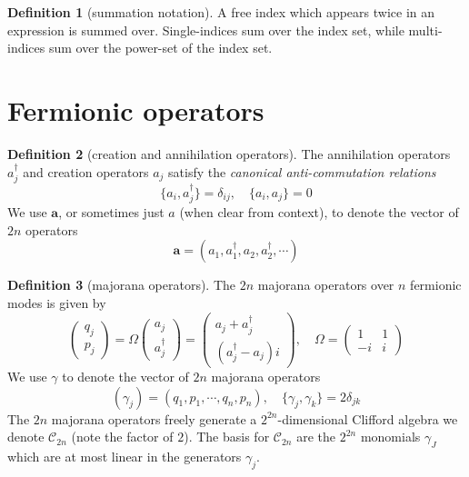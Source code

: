 \documentclass[
]{book}
\theoremstyle{definition}
\newtheorem{definition}{Definition}[chapter]
\theoremstyle{definition}
\theoremstyle{definition}
\theoremstyle{definition}
\theoremstyle{remark}
\begin{document}
\begin{definition}[summation notation]
\protect\hypertarget{def:implicitsum}{}\label{def:implicitsum}A free index which appears twice in an expression is summed over.
Single-indices sum over the index set, while multi-indices sum over the
power-set of the index set.
\end{definition}

\section{Fermionic operators}\label{fermionic-operators}

\begin{definition}[creation and annihilation operators]
\protect\hypertarget{def:car}{}\label{def:car}The annihilation operators \(a_j^\dagger\) and
creation operators \(a_j\) satisfy the \emph{canonical anti-commutation relations}
\[ 
    \{a_i, a_j^\dagger\} = \delta_{ij}, \quad \{a_i, a_j\} = 0
\]
We use \(\mathbf a\), or sometimes just \(a\) (when clear from context),
to denote the vector of \(2n\) operators
\[ 
    \mathbf a = (a_1, a_1^\dagger, a_2, a_2^\dagger, \cdots)
\]
\end{definition}

\begin{definition}[majorana operators]
\protect\hypertarget{def:maj}{}\label{def:maj}The \(2n\) majorana operators over \(n\) fermionic modes is given by
\[ 
\begin{pmatrix}
        q_j \\ p_j 
    \end{pmatrix} = \Omega \begin{pmatrix}
        a_j \\ a_j^\dagger
    \end{pmatrix} = \begin{pmatrix}
    a_j + a_j^\dagger\\ 
    (a_j^\dagger- a_j)i
    \end{pmatrix}, \quad 
    \Omega 
    = \begin{pmatrix}
        1 & 1 \\ -i & i
    \end{pmatrix}
\]
We use \(\gamma\) to denote the vector of \(2n\) majorana operators
\[ 
    (\gamma_j) = (q_1, p_1, \cdots, q_n, p_n), 
    \quad \{\gamma_j, \gamma_k\} = 2\delta_{jk}
\]
The \(2n\) majorana operators freely generate a \(2^{2n}\)-dimensional
Clifford algebra we denote \(\mathcal C_{2n}\) (note the factor of \(2\)).
The basis for \(\mathcal C_{2n}\) are the \(2^{2n}\)
monomials \(\gamma_J\) which are at most linear in the generators \(\gamma_j\).
\end{definition}
\end{document}
